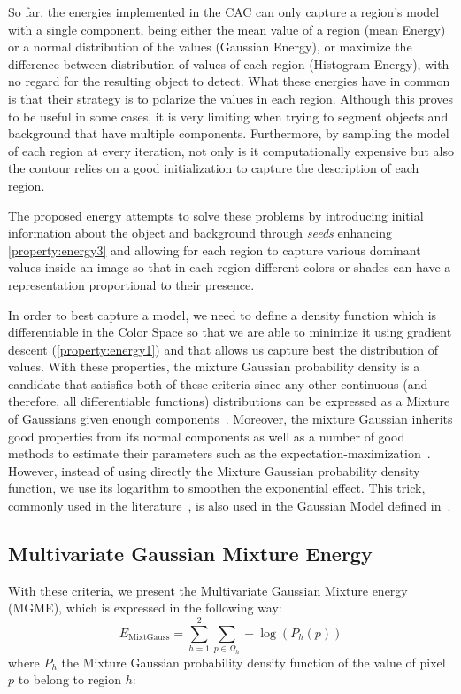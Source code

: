 So far, the energies implemented in the CAC can only capture a region's model with a single component, being either the mean value of a region (mean Energy) or a normal distribution of the values (Gaussian Energy), or maximize the difference between distribution of values of each region (Histogram Energy), with no regard for the resulting object to detect. What these energies have in common is that their strategy is to polarize the values in each region. Although this proves to be useful in some cases, it is very limiting when trying to segment objects and background that have multiple components. Furthermore, by sampling the model of each region at every iteration, not only is it  computationally expensive but also the contour relies on a good initialization to capture the description of each region.

The proposed energy attempts to solve these problems by introducing initial information about the object and background through \textit{seeds} enhancing \ref{property:energy3} and allowing for each region to capture various dominant values inside an image so that in each region different colors or shades can have a representation proportional to their presence.

 In order to best capture a model, we need to define a density function which is differentiable in the Color Space so that we are able to minimize it using gradient descent (\ref{property:energy1}) and that allows us capture best the distribution of values. With these properties, the mixture Gaussian probability density is a candidate that satisfies both of these criteria since any other continuous (and therefore, all differentiable functions) distributions can be expressed as a Mixture of Gaussians given enough components~\cite{titterington_85,Carreira2000}. Moreover, the mixture Gaussian inherits good properties from its normal components as well as a number of good methods to estimate their parameters such as the expectation-maximization~\cite{Xu95onconvergence}. However, instead of using directly the Mixture Gaussian probability density function, we use its logarithm to smoothen the exponential effect. This trick, commonly used in the literature~\cite{conf/icip/AlliliZ05,xie_mle}, is also used in the Gaussian Model defined in~\cite{ipcac2015}.

\subsection{Multivariate Gaussian Mixture Energy}
\label{subsubsec:mgme}
With these criteria, we present the Multivariate Gaussian Mixture energy (MGME), which is expressed in the following way:
\begin{equation}
E_{\mathrm{MixtGauss}} =\sum\limits_{h =1}^{2} \sum\limits_{p \in \Omega_h}-\log(P_h(p))
\end{equation}
where $P_h$ the Mixture Gaussian probability density function of the value of pixel $p$ to belong to region $h$:

